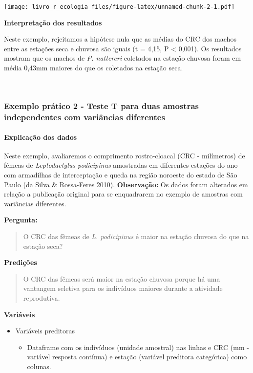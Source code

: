 \documentclass[
]{book}
\providecommand{\tightlist}{%
  \setlength{\itemsep}{0pt}\setlength{\parskip}{0pt}}
\begin{document}
\texttt{[image: livro\_r\_ecologia\_files/figure-latex/unnamed-chunk-2-1.pdf]}

\textbf{Interpretação dos resultados}

Neste exemplo, rejeitamos a hipótese nula que as médias do CRC dos machos entre as estações seca e chuvosa são iguais (t = 4,15, P \textless{} 0,001). Os resultados mostram que os machos de \emph{P. nattereri} coletados na estação chuvosa foram em média 0,43mm maiores do que os coletados na estação seca.

~

\hypertarget{exemplo-pruxe1tico-2---teste-t-para-duas-amostras-independentes-com-variuxe2ncias-diferentes}{%
\subsubsection{Exemplo prático 2 - Teste T para duas amostras independentes com variâncias diferentes}\label{exemplo-pruxe1tico-2---teste-t-para-duas-amostras-independentes-com-variuxe2ncias-diferentes}}

\hypertarget{explicauxe7uxe3o-dos-dados-1}{%
\paragraph{Explicação dos dados}\label{explicauxe7uxe3o-dos-dados-1}}

Neste exemplo, avaliaremos o comprimento rostro-cloacal (CRC - milímetros) de fêmeas de \emph{Leptodactylus podicipinus} amostradas em diferentes estações do ano com armadilhas de interceptação e queda na região noroeste do estado de São Paulo (da Silva \& Rossa-Feres 2010). \textbf{Observação:} Os dados foram alterados em relação a publicação original para se enquadrarem no exemplo de amostras com variâncias diferentes.

\textbf{Pergunta:}

\begin{quote}
O CRC das fêmeas de \emph{L. podicipinus} é maior na estação chuvosa do que na estação seca?
\end{quote}

\textbf{Predições}

\begin{quote}
O CRC das fêmeas será maior na estação chuvosa porque há uma vantangem seletiva para os indivíduos maiores durante a atividade reprodutiva.
\end{quote}

\textbf{Variáveis}

\begin{itemize}
\tightlist
\item
  Variáveis preditoras

  \begin{itemize}
  \tightlist
  \item
    Dataframe com os indivíduos (unidade amostral) nas linhas e CRC (mm - variável resposta contínua) e estação (variável preditora categórica) como colunas.
  \end{itemize}
\end{itemize}
\end{document}
